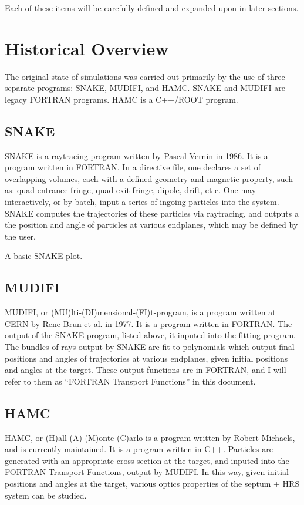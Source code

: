 \documentclass[11pt]{amsart}
\begin{document}
Each of these items will be carefully defined and expanded upon in later sections.

\newpage
\section{Historical Overview}

The original state of simulations was carried out primarily by the use of three separate programs: SNAKE, MUDIFI, and HAMC. SNAKE and MUDIFI are legacy FORTRAN programs. HAMC is a C++/ROOT program.

\subsection{SNAKE}

SNAKE is a raytracing program written by Pascal Vernin in 1986. It is a program written in FORTRAN. In a directive file, one declares a set of overlapping volumes, each with a defined geometry and magnetic property, such as: quad entrance fringe, quad exit fringe, dipole, drift, et c. One may interactively, or by batch, input a series of ingoing particles into the system. SNAKE computes the trajectories of these particles via raytracing, and outputs a the position and angle of particles at various endplanes, which may be defined by the user.

A basic SNAKE plot.

\subsection{MUDIFI}

MUDIFI, or (MU)lti-(DI)mensional-(FI)t-program, is a program written at CERN by Rene Brun et al. in 1977. It is a program written in FORTRAN. The output of the SNAKE program, listed above, it inputed into the fitting program. The bundles of rays output by SNAKE are fit to polynomials which output final positions and angles of trajectories at various endplanes, given initial positions and angles at the target. These output functions are in FORTRAN, and I will refer to them as ``FORTRAN Transport Functions'' in this document.

\subsection{HAMC}

HAMC, or (H)all (A) (M)onte (C)arlo is a program written by Robert Michaels, and is currently maintained. It is a program written in C++. Particles are generated with an appropriate cross section at the target, and inputed into the FORTRAN Transport Functions, output by MUDIFI. In this way, given initial positions and angles at the target, various optics properties of the septum + HRS system can be studied.
\end{document}
